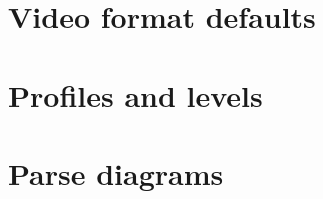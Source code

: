 \clearpage
\section{Video format defaults}

\clearpage
\section{Profiles and levels}

\clearpage
\section{Parse diagrams}

